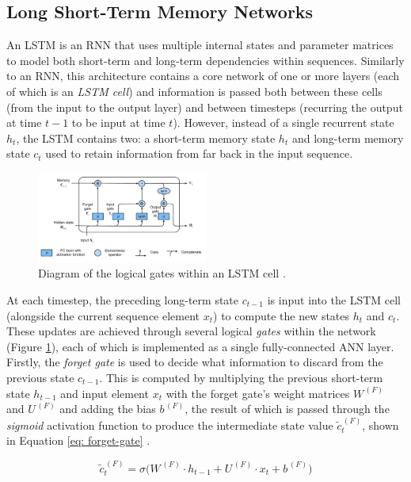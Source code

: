 \documentclass[a4paper, 11pt]{report}
\begin{document}
    \subsection{Long Short-Term Memory Networks}

    An LSTM is an RNN that uses multiple internal states and parameter matrices to model both short-term and long-term dependencies within sequences. Similarly to an RNN, this architecture contains a core network of one or more layers (each of which is an \emph{LSTM cell}) and information is passed both between these cells (from the input to the output layer) and between timesteps (recurring the output at time $t-1$ to be input at time $t$). However, instead of a single recurrent state $h_t$, the LSTM contains two: a short-term memory state $h_t$ and long-term memory state $c_t$ used to retain information from far back in the input sequence.

    \begin{figure}[ht]
        \centering
        \includegraphics[width=0.5\textwidth]{lstm.png}
        \caption{\centering Diagram of the logical gates within an LSTM cell \citep{zhang-2021}.}
        \label{fig: lstm}
    \end{figure}

    At each timestep, the preceding long-term state $c_{t-1}$ is input into the LSTM cell (alongside the current sequence element $x_t$) to compute the new states $h_t$ and $c_t$. These updates are achieved through several logical \emph{gates} within the network (Figure \ref{fig: lstm}), each of which is implemented as a single fully-connected ANN layer. Firstly, the \emph{forget gate} is used to decide what information to discard from the previous state $c_{t-1}$. This is computed by multiplying the previous short-term state $h_{t-1}$ and input element $x_t$ with the forget gate's weight matrices $W^{\,(F)}$ and $U^{\,(F)}$ and adding the bias $b^{\,(F)}$, the result of which is passed through the \emph{sigmoid} activation function to produce the intermediate state value $\tilde{c}^{\,(F)}_t$, shown in Equation \ref{eq: forget-gate} \citep{zhang-2021}.

    \begin{equation}
        \label{eq: forget-gate}
        \tilde{c}^{\,(F)}_t = \sigma \Big( W^{\,(F)} \cdot h_{t-1} + U^{\,(F)} \cdot x_t + b^{\,(F)} \Big)
    \end{equation}
\end{document}
